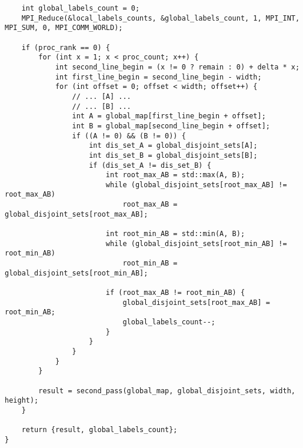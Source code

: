 \documentclass{report}
\begin{document}
\begin{lstlisting}
    int global_labels_count = 0;
    MPI_Reduce(&local_labels_counts, &global_labels_count, 1, MPI_INT, MPI_SUM, 0, MPI_COMM_WORLD);

    if (proc_rank == 0) {
        for (int x = 1; x < proc_count; x++) {
            int second_line_begin = (x != 0 ? remain : 0) + delta * x;
            int first_line_begin = second_line_begin - width;
            for (int offset = 0; offset < width; offset++) {
                // ... [A] ...
                // ... [B] ...
                int A = global_map[first_line_begin + offset];
                int B = global_map[second_line_begin + offset];
                if ((A != 0) && (B != 0)) {
                    int dis_set_A = global_disjoint_sets[A];
                    int dis_set_B = global_disjoint_sets[B];
                    if (dis_set_A != dis_set_B) {
                        int root_max_AB = std::max(A, B);
                        while (global_disjoint_sets[root_max_AB] != root_max_AB)
                            root_max_AB = global_disjoint_sets[root_max_AB];

                        int root_min_AB = std::min(A, B);
                        while (global_disjoint_sets[root_min_AB] != root_min_AB)
                            root_min_AB = global_disjoint_sets[root_min_AB];

                        if (root_max_AB != root_min_AB) {
                            global_disjoint_sets[root_max_AB] = root_min_AB;
                            global_labels_count--;
                        }
                    }
                }
            }
        }

        result = second_pass(global_map, global_disjoint_sets, width, height);
    }

    return {result, global_labels_count};
}
	\end{lstlisting}
\end{document}

